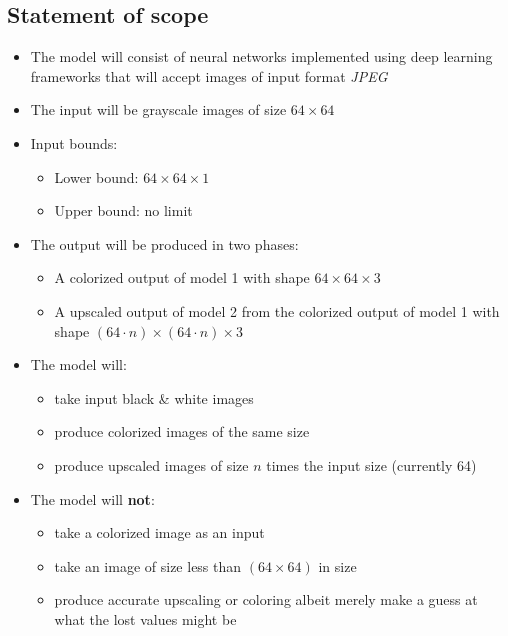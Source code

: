 \documentclass[oneside,a4paper,12pt]{report}
\begin{document}
 \subsection{Statement of scope}
	\begin{itemize}
	\item The model will consist of neural networks implemented using deep learning frameworks that will accept images of input format \textit{JPEG}
	\item The input will be grayscale images of size $64\times 64$
	\item Input bounds:
	\begin{itemize}
		\item Lower bound: $64\times 64\times 1$
		\item Upper bound: no limit
	\end{itemize}
	\item The output will be produced in two phases:
	\begin{itemize}
		\item A colorized output of model 1 with shape $64\times 64\times 3$
		\item A upscaled output of model 2 from the colorized output of model 1 with shape $(64\cdot n)\times (64\cdot n)\times 3$
	\end{itemize}
	\item The model will:
	\begin{itemize}
		\item take input black \& white images
		\item produce colorized images of the same size
		\item produce upscaled images of size $n$ times the input size (currently 64)
	\end{itemize}
	\item The model will \textbf{not}:
	\begin{itemize}
		\item take a colorized image as an input
		\item take an image of size less than $(64 \times 64)$ in size
		\item produce accurate upscaling or coloring albeit merely make a guess at what the lost values might be
	\end{itemize}
	\end{itemize}
\end{document}
